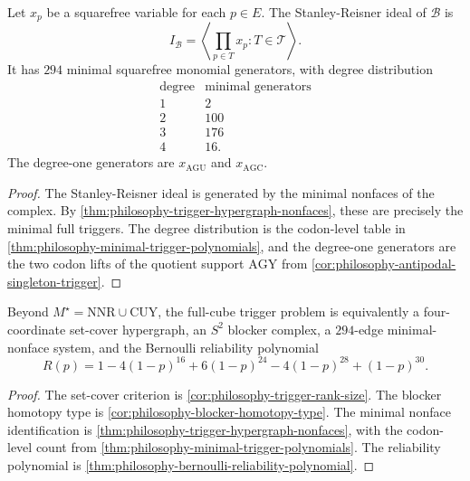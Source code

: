 \begin{theorem}
\label{thm:philosophy-stanley-reisner-trigger-ideal}
Let $x_{p}$ be a squarefree variable for each $p\in E$. The
Stanley-Reisner ideal of $\mathcal{B}$ is
$$
  I_{\mathcal{B}}
  =
  \left\langle
  \prod_{p\in T}x_{p}
  :
  T\in\mathcal{T}
  \right\rangle .
$$
It has $294$ minimal squarefree monomial generators, with degree
distribution
$$
\begin{array}{c|r}
  \text{degree} & \text{minimal generators}\\
  \hline
  1 & 2\\
  2 & 100\\
  3 & 176\\
  4 & 16.
\end{array}
$$
The degree-one generators are $x_{\mathrm{AGU}}$ and
$x_{\mathrm{AGC}}$.
\end{theorem}
\begin{proof}
The Stanley-Reisner ideal is generated by the minimal nonfaces of the
complex. By \autoref{thm:philosophy-trigger-hypergraph-nonfaces},
these are precisely the minimal full triggers. The degree distribution
is the codon-level table in
\autoref{thm:philosophy-minimal-trigger-polynomials}, and the
degree-one generators are the two codon lifts of the quotient support
$\mathrm{AGY}$ from \autoref{cor:philosophy-antipodal-singleton-trigger}.
\end{proof}

\begin{theorem}
\label{thm:philosophy-trigger-hypergraph-reliability-theorem}
Beyond $M^{\star}=\mathrm{NNR}\cup\mathrm{CUY}$, the full-cube trigger
problem is equivalently a four-coordinate set-cover hypergraph, an
$S^{2}$ blocker complex, a $294$-edge minimal-nonface system, and the
Bernoulli reliability polynomial
$$
  R(p)=1-4(1-p)^{16}+6(1-p)^{24}-4(1-p)^{28}+(1-p)^{30}.
$$
\end{theorem}
\begin{proof}
The set-cover criterion is \autoref{cor:philosophy-trigger-rank-size}.
The blocker homotopy type is
\autoref{cor:philosophy-blocker-homotopy-type}. The minimal nonface
identification is \autoref{thm:philosophy-trigger-hypergraph-nonfaces},
with the codon-level count from
\autoref{thm:philosophy-minimal-trigger-polynomials}. The reliability
polynomial is \autoref{thm:philosophy-bernoulli-reliability-polynomial}.
\end{proof}

